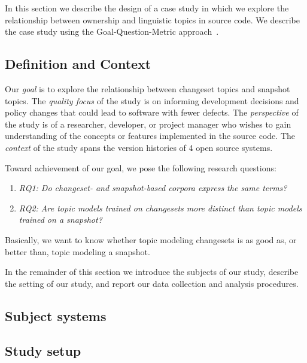 
In this section we describe the design of a case study in which we
explore the relationship between ownership and linguistic topics in source code.
We describe the case study using the Goal-Question-Metric approach~\cite{Basili-etal:94}.

\subsection{Definition and Context}

Our \textit{goal} is to explore the relationship between changeset topics and snapshot topics.
The \textit{quality focus} of the study is on informing development decisions and policy changes
that could lead to software with fewer defects.
The \textit{perspective} of the study is of a researcher, developer, or project manager who wishes
to gain understanding of the concepts or features implemented in the source code.
The \textit{context} of the study spans the version histories of 4 open source systems.

Toward achievement of our goal, we pose the following research questions:
\begin{enumerate}
    \item[]\hspace*{-20pt}\textit{RQ1: Do changeset- and snapshot-based corpora express the same terms?}
    \item[]\hspace*{-20pt}\textit{RQ2: Are topic models trained on changesets more distinct than topic models trained on a snapshot?}
\end{enumerate}
Basically, we want to know whether topic modeling changesets is as good as, or better than, topic modeling a snapshot.

In the remainder of this section we introduce the subjects of our study,
describe the setting of our study, and report our data collection and analysis procedures.

\subsection{Subject systems}


\subsection{Study setup}

